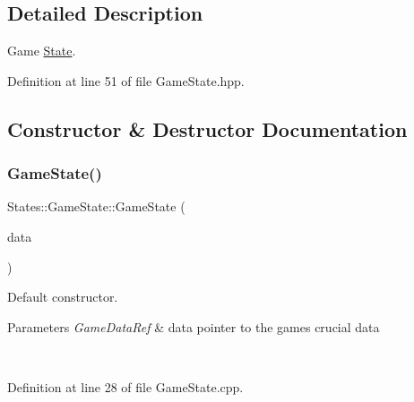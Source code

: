 \subsection{Detailed Description}
Game \mbox{\hyperlink{class_states_1_1_state}{State}}. 

\begin{DoxyVerb}\end{DoxyVerb}
 

Definition at line 51 of file Game\+State.\+hpp.



\subsection{Constructor \& Destructor Documentation}
\mbox{\label{class_states_1_1_game_state_a04083789a08165586d338792e2def8fc}} 
\subsubsection{\texorpdfstring{GameState()}{GameState()}\hspace{0.1cm}{\footnotesize\ttfamily [1/2]}}
{\footnotesize\ttfamily States\+::\+Game\+State\+::\+Game\+State (\begin{DoxyParamCaption}\item[{\mbox{\hyperlink{namespace_arktis_engine_a52e783ae007274e2a6eccc201d9400a5}{Arktis\+Engine\+::\+Game\+Data\+Ref}}}]{data }\end{DoxyParamCaption})}



Default constructor. 


\begin{DoxyParams}{Parameters}
{\em Game\+Data\+Ref} & data pointer to the game\textquotesingle{}s crucial data \begin{DoxyVerb}\end{DoxyVerb}
 \\
\hline
\end{DoxyParams}


Definition at line 28 of file Game\+State.\+cpp.


\begin{DoxyCode}{0}

\end{DoxyCode}
\mbox{\label{class_states_1_1_game_state_adf2486bf10bade0720d63f17d8199fc4}} 
